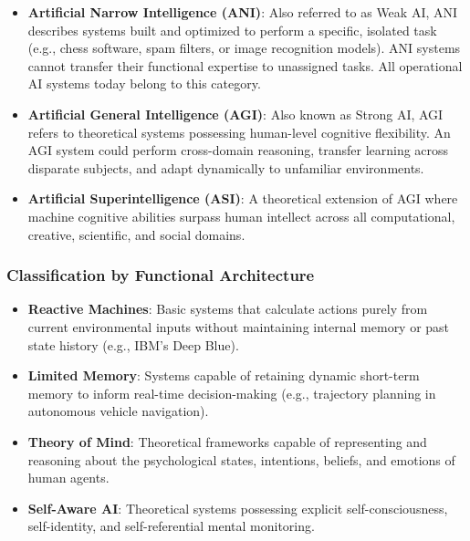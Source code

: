 \documentclass[12pt]{report}
\begin{document}
\begin{itemize}
    \item \textbf{Artificial Narrow Intelligence (ANI)}: Also referred to as Weak AI, ANI describes systems built and optimized to perform a specific, isolated task (e.g., chess software, spam filters, or image recognition models). ANI systems cannot transfer their functional expertise to unassigned tasks. All operational AI systems today belong to this category.
    \item \textbf{Artificial General Intelligence (AGI)}: Also known as Strong AI, AGI refers to theoretical systems possessing human-level cognitive flexibility. An AGI system could perform cross-domain reasoning, transfer learning across disparate subjects, and adapt dynamically to unfamiliar environments.
    \item \textbf{Artificial Superintelligence (ASI)}: A theoretical extension of AGI where machine cognitive abilities surpass human intellect across all computational, creative, scientific, and social domains.
\end{itemize}

\subsubsection{Classification by Functional Architecture}

\begin{itemize}
    \item \textbf{Reactive Machines}: Basic systems that calculate actions purely from current environmental inputs without maintaining internal memory or past state history (e.g., IBM's Deep Blue).
    \item \textbf{Limited Memory}: Systems capable of retaining dynamic short-term memory to inform real-time decision-making (e.g., trajectory planning in autonomous vehicle navigation).
    \item \textbf{Theory of Mind}: Theoretical frameworks capable of representing and reasoning about the psychological states, intentions, beliefs, and emotions of human agents.
    \item \textbf{Self-Aware AI}: Theoretical systems possessing explicit self-consciousness, self-identity, and self-referential mental monitoring.
\end{itemize}
\end{document}
